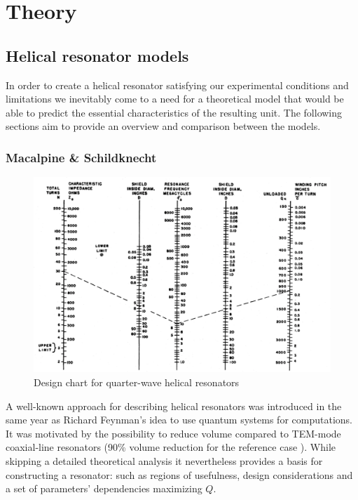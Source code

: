 \chapter{Theory}

\section{Helical resonator models}
In order to create a helical resonator satisfying our experimental conditions and limitations we inevitably come to a need for a theoretical model that would be able to predict the essential characteristics of the resulting unit. The following sections aim to provide an overview and comparison between the models.

\subsection{Macalpine \& Schildknecht}
\begin{figure}[h!]
	\centering
	\includegraphics[width=.99\textwidth]{images/macalpine_chart}
	\caption{Design chart for quarter-wave helical resonators \cite{Macalpine2000}}
	\label{fig:macalpine_chart}
\end{figure}

A well-known approach \cite{Macalpine2000} for describing helical resonators was introduced in the same year as Richard Feynman's idea \cite{Feynman1960} to use quantum systems for computations. It was motivated by the possibility to reduce volume compared to TEM-mode coaxial-line resonators (90\% volume reduction for the reference case \cite{Macalpine2000}). While skipping a detailed theoretical analysis it nevertheless provides a basis for constructing a resonator: such as regions of usefulness, design considerations and a set of parameters' dependencies maximizing $Q$.


